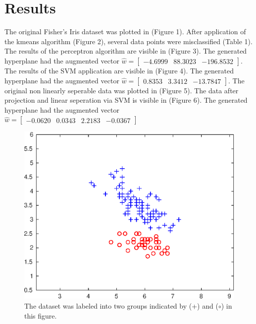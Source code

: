 \documentclass{article}
\begin{document}
	\section*{Results}
	The original Fisher's Iris dataset was plotted in (Figure 1). After application of the kmeans algorithm (Figure 2), several data points were misclassified (Table 1). The results of the perceptron algorithm are visible in (Figure 3). The generated hyperplane had the augmented vector $\hat{w} = \left[\begin{matrix}-4.6999 & 88.3023 & -196.8532\end{matrix}\right]$. The results of the SVM application are visible in (Figure 4). The generated hyperplane had the augmented vector $\hat{w} = \left[\begin{matrix}0.8353 & 3.3412 & -13.7847\end{matrix}\right]$. The original non linearly seperable data was plotted in (Figure 5). The data after projection and linear seperation via SVM is visible in (Figure 6). The generated hyperplane had the augmented vector $\hat{w} = \left[\begin{matrix}-0.0620 & 0.0343 & 2.2183 & -0.0367\end{matrix}\right]$
	\begin{figure}[H]
		\centering
		\includegraphics{plot1}
		\caption{The dataset was labeled into two groups indicated by (+) and ($\circ$) in this figure.}
	\end{figure}
\end{document}
